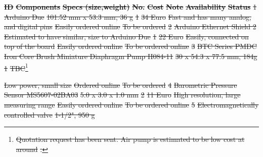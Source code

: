 \documentclass[a4paper,12pt,twoside]{article}
\providecommand{\DIFdeltex}[1]{{\protect\color{red}\sout{#1}}}                      %
\providecommand{\DIFdelbegin}{} %
\providecommand{\DIFdel}[1]{\texorpdfstring{\DIFdeltex{#1}}{}} %
\newcommand{\DIFscaledelfig}{0.5}
\newlength{\DIFdelgraphicswidth} %
\newlength{\DIFdelgraphicsheight} %
\newcommand{\DIFdelincludegraphics}[2][]{%
\sbox{\DIFdelgraphicsbox}{\DIFOincludegraphics[#1]{#2}}%
\settoboxwidth{\DIFdelgraphicswidth}{\DIFdelgraphicsbox} %
\settoboxtotalheight{\DIFdelgraphicsheight}{\DIFdelgraphicsbox} %
\scalebox{\DIFscaledelfig}{%
\parbox[b]{\DIFdelgraphicswidth}{\usebox{\DIFdelgraphicsbox}\\[-\baselineskip] \rule{\DIFdelgraphicswidth}{0em}}\llap{\resizebox{\DIFdelgraphicswidth}{\DIFdelgraphicsheight}{%
\setlength{\unitlength}{\DIFdelgraphicswidth}%
\begin{picture}(1,1)%
\thicklines\linethickness{2pt} %
{\color[rgb]{1,0,0}\put(0,0){\framebox(1,1){}}}%
{\color[rgb]{1,0,0}\put(0,0){\line( 1,1){1}}}%
{\color[rgb]{1,0,0}\put(0,1){\line(1,-1){1}}}%
\end{picture}%
}\hspace*{3pt}}} %
} %
\DeclareRobustCommand{\DIFdelbegin}{\DIFOdelbegin \let\includegraphics\DIFdelincludegraphics} %
\begin{document}
\begin{landscape}
\DIFdelbegin %
\textbf{\DIFdel{ID}} %
\textbf{\DIFdel{Components}} %
\textbf{\DIFdel{Specs (size,weight)}} %
\textbf{\DIFdel{No.}} %
\textbf{\DIFdel{Cost}} %
\textbf{\DIFdel{Note}} %
\textbf{\DIFdel{Availability}} %
\textbf{\DIFdel{Status}} %
\DIFdel{1 }%
\DIFdel{Arduino Due }%
\DIFdel{101.52 mm x 53.3 mm, 36 g }%
\DIFdel{1 }%
\DIFdel{34 Euro }%
\DIFdel{Fast and has many analog, and digital pins }%
\DIFdel{Easily ordered online }%
\DIFdel{To be ordered }%
\DIFdel{2 }%
\DIFdel{Arduino Ethernet Shield 2 }%
\DIFdel{Estimated to have similar, size to Arduino Due }%
\DIFdel{1 }%
\DIFdel{22 Euro }%
\DIFdel{Easily, connected on top of the board }%
\DIFdel{Easily ordered online }%
\DIFdel{To be ordered online }%
\DIFdel{3 }%
\DIFdel{BTC Series PMDC Iron Core Brush Miniature Diaphragm Pump H084-11 }%
\DIFdel{30 x 54.3 x 77.5 mm, 184g  }%
\DIFdel{1 }%
\DIFdel{TBC}\footnote{\DIFdel{Quotation request has been sent.  Air pump is estimated to be low cost at around }%
\DIFdel{.}} %
\addtocounter{footnote}{-1}%
\DIFdel{Low power, small size }%
\DIFdel{Ordered online }%
\DIFdel{To be ordered }%
\DIFdel{4 }%
\DIFdel{Barometric Pressure Sensor MS5607-02BA03 }%
\DIFdel{5.0 x 3.0 x 1.0 mm }%
\DIFdel{2 }%
\DIFdel{11 Euro }%
\DIFdel{High resolution, large measuring range }%
\DIFdel{Easily ordered online }%
\DIFdel{To be ordered online }%
\DIFdel{5 }%
\DIFdel{Electromagnetically controlled valve }%
\DIFdel{1-1/2", 950 g }%

\end{landscape}
\end{document}
